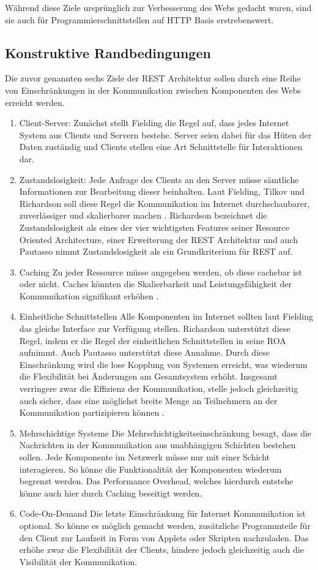 Während diese Ziele ursprünglich zur Verbesserung des Webs gedacht waren, sind sie auch für Programmierschnittstellen auf HTTP Basis erstrebenswert.

\subsection{Konstruktive Randbedingungen}

Die zuvor genannten sechs Ziele der REST Architektur sollen durch eine Reihe von Einschränkungen in der Kommunikation zwischen Komponenten des Webs erreicht werden.

\begin{enumerate}
    \item Client-Server: Zunächst stellt Fielding die Regel auf, dass jedes Internet System aus Clients und Servern bestehe. Server seien dabei für das Hüten der Daten zuständig und Clients stellen eine Art Schnittstelle für Interaktionen dar.
    \item Zustandslosigkeit: Jede Anfrage des Clients an den Server müsse sämtliche Informationen zur Bearbeitung dieser beinhalten. Laut Fielding, Tilkov und Richardson soll diese Regel die Kommunikation im Internet durchschaubarer, zuverlässiger und skalierbarer machen   . Richardson bezeichnet die Zustandslosigkeit als eines der vier wichtigsten Features seiner Resource Oriented Architecture, einer Erweiterung der REST Architektur und auch Pautasso nimmt Zustandslosigkeit als ein Grundkriterium für REST auf. 
    \item Caching Zu jeder Ressource müsse angegeben werden, ob diese cachebar ist oder nicht. Caches könnten die Skalierbarkeit und Leistungsfähigkeit der Kommunikation signifikant erhöhen .
    \item Einheitliche Schnittstellen Alle Komponenten im Internet sollten laut Fielding das gleiche Interface zur Verfügung stellen. Richardson unterstützt diese Regel, indem er die Regel der einheitlichen Schnittstellen in seine ROA aufnimmt. Auch Pautasso unterstützt diese Annahme. Durch diese Einschränkung wird die lose Kopplung von Systemen erreicht, was wiederum die Flexibilität bei Änderungen am Gesamtsystem erhöht. Insgesamt verringere zwar die Effizienz der Kommunikation, stelle jedoch gleichzeitig auch sicher, dass eine möglichst breite Menge an Teilnehmern an der Kommunikation partizipieren können .
    \item Mehrschichtige Systeme Die Mehrschichtigkeitseinschränkung besagt, dass die Nachrichten in der Kommunikation aus unabhängigen Schichten bestehen sollen. Jede Komponente im Netzwerk müsse nur mit einer Schicht interagieren. So könne die Funktionalität der Komponenten wiederum begrenzt werden. Das Performance Overhead, welches hierdurch entstehe könne auch hier durch Caching beseitigt werden.
    \item Code-On-Demand Die letzte Einschränkung für Internet Kommunikation ist optional. So könne es möglich gemacht werden, zusätzliche Programmteile für den Client zur Laufzeit in Form von Applets oder Skripten nachzuladen. Das erhöhe zwar die Flexibilität der Clients, hindere jedoch gleichzeitig auch die Visibilität der Kommunikation.
\end{enumerate}

